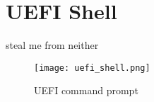 
\section{\acs{UEFI} Shell}

steal me from neither

\begin{figure}[htb]
    \centering
    \texttt{[image: uefi\_shell.png]}
    \caption{\ac{UEFI} command prompt}
    \label{fig:uefi-shell}
\end{figure}

